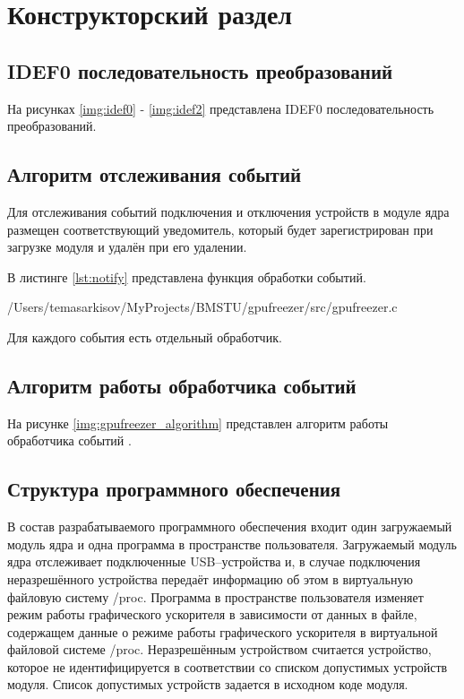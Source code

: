 \chapter{Конструкторский раздел}

\section{IDEF0 последовательность преобразований}

На рисунках \ref{img:idef0} - \ref{img:idef2} представлена IDEF0 последовательность преобразований.




\newpage
\section{Алгоритм отслеживания событий}

Для отслеживания событий подключения и отключения устройств в модуле ядра размещен соответствующий уведомитель, который будет зарегистрирован при загрузке модуля и удалён при его удалении.

В листинге \ref{lst:notify} представлена функция обработки событий.

\begin{lstinputlisting}[
	caption={Обработка событий},
	label={lst:notify},
	style={c},
	linerange={192-214},
	]{/Users/temasarkisov/MyProjects/BMSTU/gpufreezer/src/gpufreezer.c}
\end{lstinputlisting}

Для каждого события есть отдельный обработчик.

\newpage
\section{Алгоритм работы обработчика событий}

На рисунке \ref{img:gpufreezer_algorithm} представлен алгоритм работы обработчика событий .


\section{Структура программного обеспечения}

В состав разрабатываемого программного обеспечения входит один загружаемый модуль ядра и одна программа в пространстве пользователя. Загружаемый модуль ядра отслеживает подключенные USB--устройства и, в случае подключения неразрешённого устройства передаёт информацию об этом в виртуальную файловую систему /proc. Программа в пространстве пользователя изменяет режим работы графического ускорителя в зависимости от данных в файле, содержащем данные о режиме работы графического ускорителя в виртуальной файловой системе /proc. Неразрешённым устройством считается устройство, которое не идентифицируется в соответствии со списком допустимых устройств модуля. Список допустимых устройств задается в исходном коде модуля.
